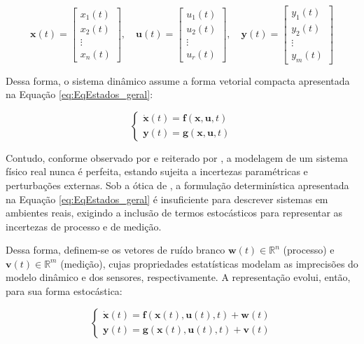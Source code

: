 \documentclass[a4paper,12pt]{article}
\begin{document}
\begin{equation}
    \mathbf{x}(t) = \begin{bmatrix} x_1(t) \\ x_2(t) \\ \vdots \\ x_n(t) \end{bmatrix}, \quad
    \mathbf{u}(t) = \begin{bmatrix} u_1(t) \\ u_2(t) \\ \vdots \\ u_r(t) \end{bmatrix}, \quad
    \mathbf{y}(t) = \begin{bmatrix} y_1(t) \\ y_2(t) \\ \vdots \\ y_m(t) \end{bmatrix}
\end{equation}

Dessa forma, o sistema dinâmico assume a forma vetorial compacta apresentada na Equação \ref{eq:EqEstados_geral}:

\begin{equation}
    \begin{cases} 
        \dot{\mathbf{x}}(t) = \mathbf{f}(\mathbf{x}, \mathbf{u}, t) \\
        \mathbf{y}(t) = \mathbf{g}(\mathbf{x}, \mathbf{u}, t)
    \end{cases}
    \label{eq:EqEstados_geral}
\end{equation}

Contudo, conforme observado por  e reiterado por , a modelagem de um sistema físico real nunca é perfeita, estando sujeita a incertezas paramétricas e perturbações externas. Sob a ótica de , a formulação determinística apresentada na Equação \eqref{eq:EqEstados_geral} é insuficiente para descrever sistemas em ambientes reais, exigindo a inclusão de termos estocásticos para representar as incertezas de processo e de medição. 

Dessa forma, definem-se os vetores de ruído branco $\mathbf{w}(t) \in \mathbb{R}^n$ (processo) e $\mathbf{v}(t) \in \mathbb{R}^m$ (medição), cujas propriedades estatísticas modelam as imprecisões do modelo dinâmico e dos sensores, respectivamente. A representação evolui, então, para sua forma estocástica:

\begin{equation}
    \begin{cases} 
            \dot{\mathbf{x}}(t) = \mathbf{f}(\mathbf{x}(t), \mathbf{u}(t),t) +\mathbf{w}(t)\\
            \mathbf{y}(t) = \mathbf{g}(\mathbf{x}(t),\mathbf{u}(t),t)+\mathbf{v}(t)
    \end{cases}
    \label{eq:EqEstados_estocastico}
\end{equation}
\end{document}
